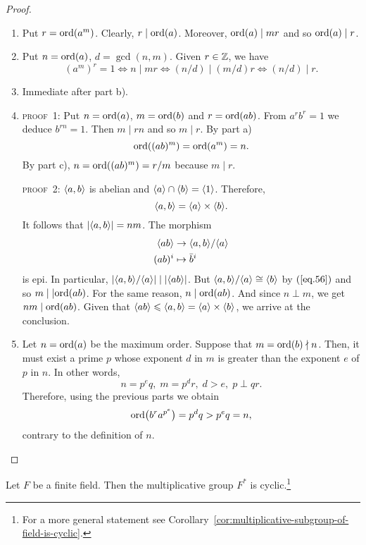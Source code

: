 \begin{proof}${}$
\begin{enumerate}[\rm a)]
    \item Put $r={\rm ord}(a^m)$. Clearly, $r\mid{\rm ord}(a)$. Moreover, ${\rm ord}(a)\mid mr$ and so ${\rm ord}(a)\mid r$.
    
    \item Put $n={\rm ord}(a)$, $d=\gcd(n,m)$. Given $r\in\mathbb{Z}$, we have
    $$
        (a^m)^r=1\iff n\mid mr\iff (n/d)\mid (m/d)r
            \iff (n/d)\mid r.
    $$
    
    \item Immediate after part b).

    \item \textsc{proof~1:} Put $n={\rm ord}(a)$, $m={\rm ord}(b)$ and $r={\rm ord}(ab)$. From $a^rb^r=1$ we deduce $b^{rn}=1$. Then $m\mid rn$ and so $m\mid r$. By part a)
    $$
        {\rm ord}((ab)^m)={\rm ord}(a^m)=n.
    $$
    By part c), $n={\rm ord}((ab)^m)=r/m$ because $m\mid r$.

    \textsc{proof~2:} $\langle a,b\rangle$ is abelian and $\langle a\rangle\cap\langle b\rangle=\langle1\rangle$. Therefore,
    \begin{equation}\label{eq.56}
        \langle a,b\rangle=\langle a\rangle\times\langle b\rangle.
    \end{equation}
    It follows that $|\langle a,b\rangle|=nm$. The morphism
    \begin{align*}
        \langle ab\rangle&\to\langle a,b\rangle/\langle a\rangle\\
        (ab)^i&\mapsto \bar b^i
    \end{align*}
    is epi. In particular, $|\langle a,b\rangle/\langle a\rangle|\mid|\langle ab\rangle|$. But $\langle a,b\rangle/\langle a\rangle\cong\langle b\rangle$ by $(\ref{eq.56})$ and so $m\mid|{\rm ord}(ab)$. For the same reason, $n\mid{\rm ord}(ab)$. And since $n\perp m$, we get $nm\mid{\rm ord}(ab)$. Given that $\langle ab\rangle\leqslant\langle a,b\rangle=\langle a\rangle\times\langle b\rangle$, we arrive at the conclusion.
    
    \item Let $n={\rm ord}(a)$ be the maximum order. Suppose that $m={\rm ord}(b)\nmid n$. Then, it must exist a prime $p$ whose exponent $d$ in $m$ is greater than the exponent $e$ of $p$ in $n$. In other words,
    $$
        n=p^eq,\; m=p^dr,\; d>e,\; p\perp qr.
    $$
    Therefore, using the previous parts we obtain
    $$
        {\rm ord}\big(b^ra^{p^e}\big)=p^dq> p^eq=n,
    $$
    contrary to the definition of $n$.
\end{enumerate}
\end{proof}

\begin{prop}
    Let\/ $F$ be a finite field. Then the multiplicative group $F^*$ is cyclic.\footnote{For a more general statement see Corollary~\ref{cor:multiplicative-subgroup-of-field-is-cyclic}.}
\end{prop}

